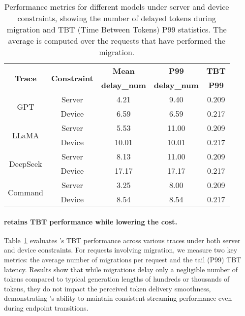 \setlength{\tabcolsep}{4pt}
\begin{table}[t]
    \centering
    \footnotesize
    \begin{tabularx}{\linewidth}{ccccc}
    \toprule
    \multirow{2}{*}{\textbf{Trace}} & \multirow{2}{*}{\textbf{Constraint}} & \textbf{Mean} & \textbf{P99} & \textbf{TBT} \\
    & & \textbf{delay\_num} & \textbf{delay\_num} & \textbf{P99} \\
    \midrule
    \multirow{2}{*}{GPT} & Server & 4.21 & 9.40 & 0.209 \\
    & Device & 6.59 & 6.59 & 0.217 \\
    \hline
    \multirow{2}{*}{LLaMA} & Server & 5.53 & 11.00 & 0.209 \\
    & Device & 10.01 & 10.01 & 0.217 \\
    \hline
    \multirow{2}{*}{DeepSeek} & Server & 8.13 & 11.00 & 0.209 \\
    & Device & 17.17 & 17.17 & 0.217 \\
    \hline
    \multirow{2}{*}{Command} & Server & 3.25 & 8.00 & 0.209 \\
    & Device & 8.54 & 8.54 & 0.217 \\
    \bottomrule
    \end{tabularx}
    \caption{Performance metrics for different models under server and device constraints, showing the number of delayed tokens during migration and TBT (Time Between Tokens) P99 statistics. The average is computed over the requests that have performed the migration. 
    }
    \label{tab:performance-metrics}
\end{table}

\paragraph{\disco{} retains TBT performance while lowering the cost.} 
Table~\ref{tab:performance-metrics} evaluates \disco{}'s TBT performance across various traces under both server and device constraints. For requests involving migration, we measure two key metrics: the average number of migrations per request and the tail (P99) TBT latency. Results show that while migrations delay only a negligible number of tokens compared to typical generation lengths of hundreds or thousands of tokens, they do not impact the perceived token delivery smoothness, demonstrating \disco{}'s ability to maintain consistent streaming performance even during endpoint transitions.

